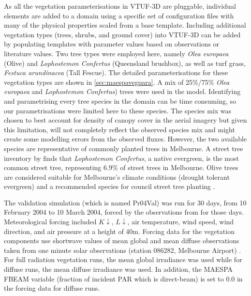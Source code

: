 \documentclass[final,3p,times,authoryear]{elsarticle}
\begin{document}
As all the vegetation parameterisations in VTUF-3D are pluggable, individual elements are added to a domain using a specific set of configuration files with many of the physical properties scaled from a base template.  Including additional vegetation types (trees, shrubs, and ground cover) into VTUF-3D can be added by populating templates with parameter values based on observations or literature values. Two tree types were employed here, namely \textit{Olea europaea} (Olive) and \textit{Lophostemon Confertus} (Queensland brushbox), as well as turf grass, \textit{Festuca arundinacea} (Tall Fescue). The detailed parameterisations for these vegetation types are shown in \ref{sec:maespavegpara}. A mix of 25\%/75\% \textit{Olea europaea} and \textit{Lophostemon Confertus}) trees were used in the model. Identifying and parametrising every tree species in the domain can be time consuming, so our parametrisations were limited here to these species. The species mix was chosen to best account for density of canopy cover in the aerial imagery but given this limitation, will not completely reflect the observed species mix and might create some modelling errors from the observed fluxes. However, the two available species are representative of commonly planted trees in Melbourne. A street tree inventory by \cite{Frank2006} finds that \textit{Lophostemon Confertus}, a native evergreen, is the most common street tree, representing 6.9\% of street trees in Melbourne. Olive trees are considered suitable for Melbourne's climate conditions (drought tolerant evergreen) and a recommended species for council street tree planting \citep{PortPhillip2010}.

The validation simulation (which is named Pr04Val) was run for 30 days, from 10 February 2004 to 10 March 2004, forced by the observations from \cite{Coutts2007} for those days. Meteorological forcing included $K\downarrow$, $L\downarrow$, air temperature, wind speed, wind direction, and air pressure at a height of 40m. Forcing data for the vegetation components use shortwave values of mean global and mean diffuse observations taken from one minute solar observations (station 086282, Melbourne Airport) \citep{BOM2016}. For full radiation vegetation runs, the mean global irradiance was used while for diffuse runs, the mean diffuse irradiance was used. In addition, the MAESPA FBEAM variable (fraction of incident PAR which is direct-beam) is set to 0.0 in the forcing data for diffuse runs.
\end{document}
